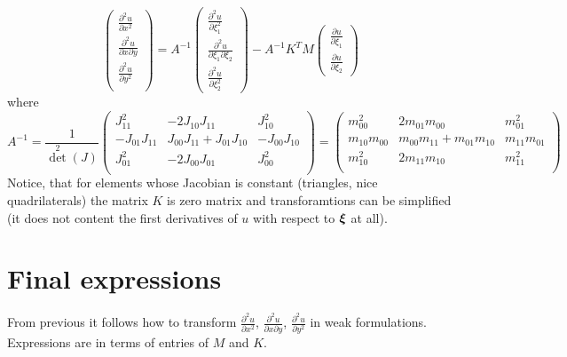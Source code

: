 \documentclass[a4paper,12pt]{article}
\newcommand{\bfxi}{\mbox{\boldmath $\xi$}}
\begin{document}
$$
\left(\begin{array}{c}
\frac{\partial^2 u}{\partial x^2} \\[3mm]
\frac{\partial^2 u}{\partial x \partial y} \\[3mm]
\frac{\partial^2 u}{\partial y^2} \\[3mm]
\end{array}\right) = A^{-1}
\left(\begin{array}{c}
\frac{\partial^2 u}{\partial \xi_1^2} \\[3mm]
\frac{\partial^2 u}{\partial \xi_1 \partial \xi_2} \\[3mm]
\frac{\partial^2 u}{\partial \xi_2^2}
\end{array}\right) -
A^{-1} K^T M
\left(\begin{array}{c}
\frac{\partial u}{\partial \xi_1} \\[3mm]
\frac{\partial u}{\partial \xi_2}
\end{array}\right)
$$
where
$$
A^{-1} = \frac{1}{\det^2(J)}
\left(\begin{array}{ccc}
J_{11}^2 & -2J_{10}J_{11} & J_{10}^2 \\[3mm]
-J_{01}J_{11} & J_{00}J_{11} + J_{01}J_{10} & -J_{00}J_{10} \\[3mm]
J_{01}^2 & -2J_{00}J_{01} & J_{00}^2 \\[3mm]
\end{array}\right) =
\left(\begin{array}{ccc}
m_{00}^2 & 2m_{01}m_{00} & m_{01}^2 \\[3mm]
m_{10}m_{00} & m_{00}m_{11} + m_{01}m_{10} & m_{11}m_{01} \\[3mm]
m_{10}^2 & 2m_{11}m_{10} & m_{11}^2 \\[3mm]
\end{array}\right)
$$
Notice, that for elements whose Jacobian is constant (triangles, nice quadrilaterals) the matrix $K$ is zero matrix and transforamtions can be simplified (it does not content the first derivatives of $u$ with respect to $\bfxi$ at all).

\section{Final expressions}
From previous it follows how to transform $\frac{\partial^2 u}{\partial x^2}$, $\frac{\partial^2 u}{\partial x \partial y}$, $\frac{\partial^2 u}{\partial y^2}$ in weak formulations. Expressions are in terms of entries of $M$ and $K$.
\end{document}
